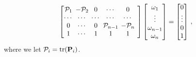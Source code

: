 \documentclass[letterpaper, 10 pt, conference]{ieeeconf}  %
\providecommand{\DIFaddbegin}{} %
\providecommand{\DIFaddend}{} %
\providecommand{\DIFdelbegin}{} %
\providecommand{\DIFdelend}{} %
\begin{document}
\begin{equation}
   \DIFdelbegin %
\DIFdelend \DIFaddbegin \begingroup
   \setlength\arraycolsep{2pt}
   \begin{bmatrix}
      \mathcal{P}_1 & -\mathcal{P}_2 & 0 & \cdots & 0 \\
      \cdots & \cdots & \cdots & \cdots & \cdots & \\
      0 & \cdots & 0 & \mathcal{P}_{n-1} & -\mathcal{P}_{n} \\
      1 & \cdots & 1 & 1 & 1 &
   \end{bmatrix}\DIFaddend 
   \DIFdelbegin %
\DIFdelend \DIFaddbegin \begin{bmatrix}
      \omega_1 \\
      \vdots \\
      \omega_{n-1} \\
      \omega_{n}
   \end{bmatrix}\DIFaddend 
   =
   \DIFdelbegin %
\DIFdelend \DIFaddbegin \begin{bmatrix}
      0 \\
      \vdots \\
      0 \\
      1
   \end{bmatrix}\DIFaddend \,, \label{eqn:fci_eq_sys}
   \DIFaddbegin \endgroup
\DIFaddend \end{equation}
where we let $\mathcal{P}_i = \operatorname{tr}({{\mathbf{P}}}_i)$.
\end{document}

